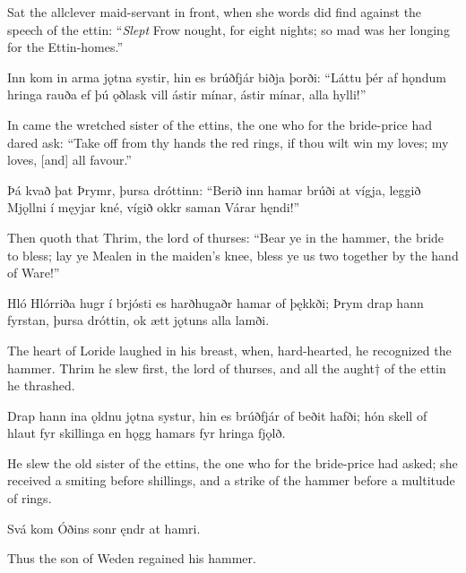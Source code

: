 Sat the allclever maid-servant in front, when she words did find against the speech of the ettin: “\emph{Slept} Frow nought, for eight nights; so mad was her longing for the Ettin-homes.”

Inn kom in arma \hld jǫtna systir,
hin es brúðfjár \hld biðja þorði:
“Láttu þér af hǫndum \hld hringa rauða
ef þú ǫðlask vill \hld ástir mínar,
ástir mínar, \hld alla hylli!”

In came the wretched sister of the ettins, the one who for the bride-price had dared ask: “Take off from thy hands the red rings, if thou wilt win my loves; my loves, [and] all favour.”\footnotemark[1]

Þá kvað þat Þrymr, \hld þursa dróttinn:
“Berið inn hamar \hld brúði at vígja,
leggið Mjǫllni \hld í męyjar kné,
vígið okkr saman \hld Várar hęndi!”

Then quoth that Thrim, the lord of thurses: “Bear ye in the hammer, the bride to bless; lay ye Mealen in the maiden’s knee, bless ye us two together by the hand of Ware\footnotemark[1]!”

Hló Hlórriða \hld hugr í brjósti
es harðhugaðr \hld hamar of þękkði;
Þrym drap hann fyrstan, \hld þursa dróttin,
ok ætt jǫtuns \hld alla lamði. 

The heart of Loride laughed in his breast, when, hard-hearted, he recognized the hammer. Thrim he slew first, the lord of thurses, and all the aught† of the ettin he thrashed.

Drap hann ina ǫldnu \hld jǫtna systur,
hin es brúðfjár \hld of beðit hafði;
hón skell of hlaut \hld fyr skillinga
en hǫgg hamars \hld fyr hringa fjǫlð.

He slew the old sister of the ettins, the one who for the bride-price had asked; she received a smiting before shillings, and a strike of the hammer before a multitude of rings.

Svá kom Óðins sonr \hld ęndr at hamri. 

Thus the son of Weden regained his hammer.
